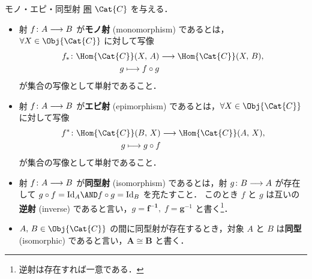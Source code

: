 \documentclass[TQFT_main]{subfiles}
\begin{document}
\begin{mydef}[label=def:iso]{モノ・エピ・同型射}
	\hyperref[def:category]{圏} $\Cat{C}$ を与える．
	\begin{itemize}
        \item 射 $f \colon A \longrightarrow B$ が\textbf{モノ射} (monomorphism) であるとは，$\forall X \in \Obj{\Cat{C}}$ に対して写像
        \begin{align}
            f_* \colon \Hom{\Cat{C}} (X,\, A) &\lto \Hom{\Cat{C}} (X,\, B), \\
            g \lmto f \circ g
        \end{align}
        が集合の写像として単射であること．
        \item 射 $f \colon A \longrightarrow B$ が\textbf{エピ射} (epimorphism) であるとは，$\forall  X \in \Obj{\Cat{C}}$ に対して写像
        \begin{align}
            f^* \colon \Hom{\Cat{C}} (B,\, X) &\lto \Hom{\Cat{C}} (A,\, X), \\
            g \lmto g \circ f
        \end{align}
        が集合の写像として単射であること．
		\item 射 $f \colon A \longrightarrow B$ が\textbf{同型射} (isomorphism) であるとは，射 $g \colon B \longrightarrow A$ が存在して
		$ g \circ f = \mathrm{Id}_A \AND f \circ g = \mathrm{Id}_B$ を充たすこと．
		このとき $f$ と $g$ は互いの\textbf{逆射} (inverse) であると言い，$g = \bm{f^{-1}},\; f = \bm{g}^{-1}$ と書く\footnote{逆射は存在すれば一意である．}．
		\item $A,\, B \in \Obj{\Cat{C}}$ の間に同型射が存在するとき，対象 $A$ と $B$ は\textbf{同型} (isomorphic) であると言い，$\bm{A\cong B}$ と書く．
	\end{itemize}
\end{mydef}
\end{document}
